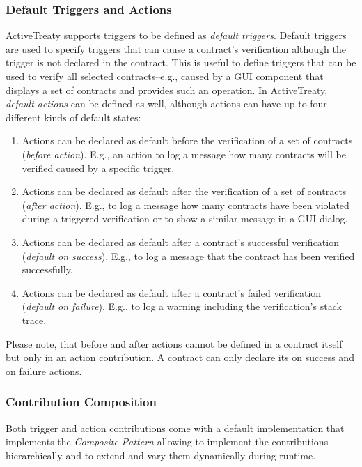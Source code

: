 \documentclass{llncs}
\begin{document}
\subsubsection{Default Triggers and Actions}

ActiveTreaty supports triggers to be defined as \textit{default triggers}. Default triggers are used to specify triggers that can cause a contract's verification although the trigger is not declared in the contract. This is useful to define triggers that can be used to verify all selected contracts--e.g., caused by a GUI component that displays a set of contracts and provides such an operation. In ActiveTreaty, \textit{default actions} can be defined as well, although actions can have up to four different kinds of default states:

\begin{enumerate}
	\item Actions can be declared as default before the verification of a set of contracts (\textit{before action}). E.g., an action to log a message how many contracts will be verified caused by a specific trigger.
	\item Actions can be declared as default after the verification of a set of contracts (\textit{after action}). E.g., to log a message how many contracts have been violated during a triggered verification or to show a similar message in a GUI dialog.
	\item Actions can be declared as default after a contract's successful verification (\textit{default on success}). E.g., to log a message that the contract has been verified successfully.
	\item Actions can be declared as default after a contract's failed verification (\textit{default on failure}). E.g., to log a warning including the verification's stack trace.
\end{enumerate}

Please note, that before and after actions cannot be defined in a contract itself but only in an action contribution. A contract can only declare its on success and on failure actions.

\subsubsection{Contribution Composition}

Both trigger and action contributions come with a default implementation that implements the \textit{Composite Pattern} \cite{GangOf4} allowing to implement the contributions hierarchically and to extend and vary them dynamically during runtime.
\end{document}
